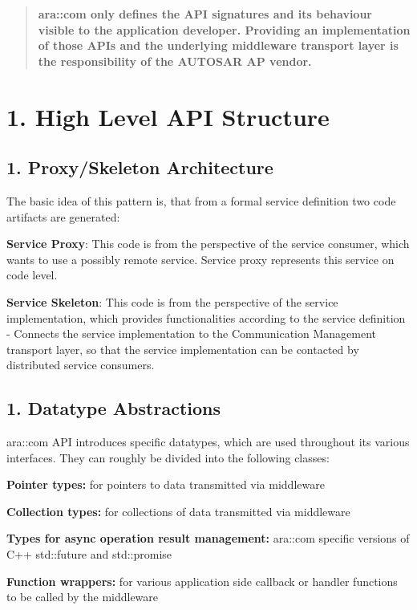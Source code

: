 \begin{quote}
{\bfseries ara\+::com only defines the A\+PI signatures and its behaviour visible to the application developer. Providing an implementation of those A\+P\+Is and the underlying middleware transport layer is the responsibility of the A\+U\+T\+O\+S\+AR AP vendor.} \end{quote}


\section*{1. High Level A\+PI Structure}

\subsection*{1. Proxy/\+Skeleton Architecture}


\begin{DoxyItemize}
\item The basic idea of this pattern is, that from a formal service definition two code artifacts are generated\+: 
\begin{DoxyItemize}
\item {\bfseries Service Proxy}\+: This code is from the perspective of the service consumer, which wants to use a possibly remote service. Service proxy represents this service on code level.
\item {\bfseries Service Skeleton}\+: This code is from the perspective of the service implementation, which provides functionalities according to the service definition -\/ Connects the service implementation to the Communication Management transport layer, so that the service implementation can be contacted by distributed service consumers.
\end{DoxyItemize}
\end{DoxyItemize}

\subsection*{1. Datatype Abstractions}


\begin{DoxyItemize}
\item ara\+::com A\+PI introduces specific datatypes, which are used throughout its various interfaces. They can roughly be divided into the following classes\+:
\begin{DoxyItemize}
\item {\bfseries Pointer types\+:} for pointers to data transmitted via middleware
\item {\bfseries Collection types\+:} for collections of data transmitted via middleware
\item {\bfseries Types for async operation result management\+:} ara\+::com specific versions of C++ std\+::future and std\+::promise
\item {\bfseries Function wrappers\+:} for various application side callback or handler functions to be called by the middleware
\end{DoxyItemize}
\end{DoxyItemize}

